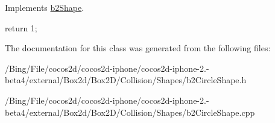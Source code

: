 Implements \hyperlink{classb2_shape_a05a3c445017d96df9238ceefe6ce37ab}{b2\-Shape}.


\begin{DoxyCode}
{
        return 1;
}
\end{DoxyCode}


The documentation for this class was generated from the following files\-:\begin{DoxyCompactItemize}
\item 
/\-Bing/\-File/cocos2d/cocos2d-\/iphone/cocos2d-\/iphone-\/2.-\/beta4/external/\-Box2d/\-Box2\-D/\-Collision/\-Shapes/b2\-Circle\-Shape.\-h\item 
/\-Bing/\-File/cocos2d/cocos2d-\/iphone/cocos2d-\/iphone-\/2.-\/beta4/external/\-Box2d/\-Box2\-D/\-Collision/\-Shapes/b2\-Circle\-Shape.\-cpp\end{DoxyCompactItemize}
